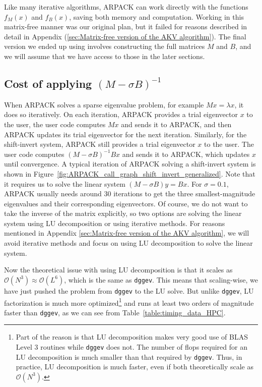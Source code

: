 \documentclass{iopjournal}
\begin{document}
Like many iterative algorithms, ARPACK can work directly with the functions $f_M(x)$ and $f_B(x)$, saving both memory and computation. Working in this matrix-free manner was our original plan, but it failed for reasons described in detail in Appendix (\ref{sec:Matrix-free version of the AKV algorithm}). The final version we ended up using involves constructing the full matrices $M$ and $B$, and we will assume that we have access to those in the later sections.

\subsection{\label{ssec:action-of-shift-invert} Cost of applying \texorpdfstring{$(M-\sigma B)^{-1}$}{the inverse of (M-sigma B)}}

When ARPACK solves a sparse eigenvalue problem, for example $Mx=\lambda x$, it does so iteratively. On each iteration, ARPACK provides a trial eigenvector $x$ to the user, the user code computes $Mx$ and sends it to ARPACK, and then ARPACK updates its trial eigenvector for the next iteration. Similarly, for the shift-invert system, ARPACK still provides a trial eigenvector $x$ to the user. The user code computes $(M-\sigma B)^{-1}Bx$ and sends it to ARPACK, which updates $x$ until convergence.
A typical iteration of ARPACK solving a shift-invert system is shown in Figure~\ref{fig:ARPACK_call_graph_shift_invert_generalized}. Note that it requires us to solve the linear system $(M-\sigma B) y=Bx$. For $\sigma=0.1$, ARPACK usually needs around 30 iterations to get the three smallest-magnitude eigenvalues and their corresponding eigenvectors. Of course, we do not want to take the inverse of the matrix explicitly, so two options are solving the linear system using LU decomposition or using iterative methods. For reasons mentioned in Appendix \ref{sec:Matrix-free version of the AKV algorithm}, we will avoid iterative methods and focus on using LU decomposition to solve the linear system.

Now the theoretical issue with using LU decomposition is that it scales as $\mathcal{O}(N^3) \approx \mathcal{O}(L^6)$, which is the same as \texttt{dggev}. This means that scaling-wise, we have just pushed the problem from \texttt{dggev} to the LU solve. But unlike \texttt{dggev}, LU factorization is much more optimized\footnote{Part of the reason is that LU decomposition makes very good use of BLAS Level 3 routines while \texttt{dggev} does not. The number of flops required for an LU decomposition is much smaller than that required by \texttt{dggev}. Thus, in practice, LU decomposition is much faster, even if both theoretically scale as $\mathcal{O}(N^3)$.} and runs at least two orders of magnitude faster than \texttt{dggev}, as we can see from Table~\ref{table:timing_data_HPC}.
\end{document}
